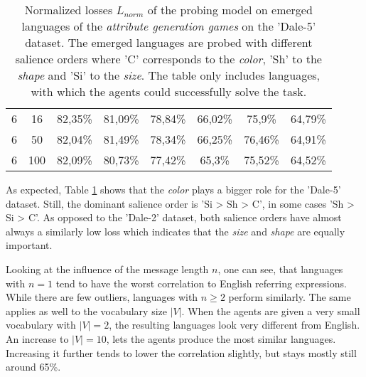 \begin{table}[ht]
\begin{tabular}{cc|c|c|c|c|c|c}
        {6} & {16}  & {82,35\%}                & {81,09\%}                & {78,84\%}                & {66,02\%}                & {75,9\%}                 & {64,79\%}                \\
        {6} & {50}  & {82,04\%}                & {81,49\%}                & {78,34\%}                & {66,25\%}                & {76,46\%}                & {64,91\%}                \\
        {6} & {100} & {82,09\%}                & {80,73\%}                & {77,42\%}                & {65,3\%}                 & {75,52\%}                & {64,52\%}                \\
        \bottomrule
    \end{tabular}
    \caption{Normalized losses $L_{norm}$ of the probing model on emerged languages of the \emph{attribute generation games} on the 'Dale-5' dataset. The emerged languages are probed with different salience orders where 'C' corresponds to the \emph{color}, 'Sh' to the \emph{shape} and 'Si' to the \emph{size}. The table only includes languages, with which the agents could successfully solve the task.}
    \label{tab:probing:attribute-generator:dale-5}
\end{table}

As expected, Table \ref{tab:probing:attribute-generator:dale-5} shows that the \emph{color} plays a bigger role for the 'Dale-5' dataset.
Still, the dominant salience order is 'Si > Sh > C', in some cases 'Sh > Si > C'.
As opposed to the 'Dale-2' dataset, both salience orders have almost always a similarly low loss which indicates that the \emph{size} and \emph{shape} are equally important.

Looking at the influence of the message length $n$, one can see, that languages with $n=1$ tend to have the worst correlation to English referring expressions.
While there are few outliers, languages with $n \geq 2$ perform similarly.
The same applies as well to the vocabulary size $|V|$.
When the agents are given a very small vocabulary with $|V|=2$, the resulting languages look very different from English.
An increase to $|V|=10$, lets the agents produce the most similar languages.
Increasing it further tends to lower the correlation slightly, but stays mostly still around 65\%.

